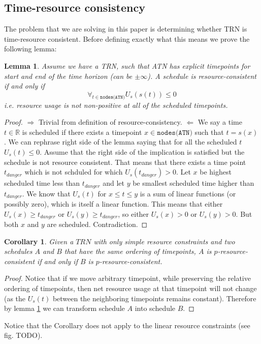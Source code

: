 \documentclass{article}
\newtheorem{corollary}{Corollary}[theorem]
\newtheorem{lemma}[theorem]{Lemma}
\begin{document}
\begin{multicols}{2}
\subsection{Time-resource consistency}
The problem that we are solving in this paper is determining whether TRN is time-resource consistent. Before defining exactly what this means we prove the following lemma:

\begin{lemma}
\label{resource_checking}
Assume we have a TRN, such that ATN has explicit timepoints for start and end of the time horizon (can be $\pm \infty$).
A schedule is resource-consistent if and only if
\[
\forall_{t \in \texttt{nodes(ATN)}} U_s(s(t)) \leq 0
\]
i.e. resource usage is not non-positive at all of the scheduled timepoints.
\end{lemma}
\begin{proof}
$\Rightarrow$ Trivial from definition of resource-consistency.
$\Leftarrow$ We say a time $t \in \mathbb{R}$ is scheduled if there exists a timepoint  $x \in \texttt{nodes(ATN)}$ such that $t = s(x)$. We can rephrase right side of the lemma saying that for all the scheduled $t$ $U_s(t) \leq 0$. Assume that the right side of the implication is satisfied but the schedule is not resource consistent. That means that there exists a time point $t_{danger}$ which is not schduled for which $U_s(t_{danger}) > 0 $. Let $x$ be highest scheduled time less than $t_{danger}$ and let $y$ be smallest scheduled time higher than $t_{danger}$. We know that $U_s(t)$ for $x \leq t \leq y$ is a sum of linear functions (or possibly zero), which is itself a linear function. This means that either $U_s(x) \geq t_{danger}$ or $U_s(y) \geq t_{danger}$, so either $U_s(x) > 0$ or $U_s(y) > 0$. But both $x$ and $y$ are scheduled. Contradiction.

\end{proof}
\begin{corollary}
Given a $TRN$ with only simple resource constraints and two schedules $A$ and $B$ that have the same ordering of timepoints, $A$ is $p$-resource-consistent if and only if $B$ is $p$-resource-consistent.
\end{corollary}
\begin{proof}
Notice that if we move arbitrary timepoint, while preserving the relative ordering of timepoints, then net resource usage at that timepoint will not change (as the $U_s(t)$ between the neighboring timepoints remains constant). Therefore by lemma \ref{resource_checking} we can transform schedule $A$ into schedule $B$.
\end{proof}
Notice that the Corollary does not apply to the linear resource constraints (see fig. TODO).


\end{multicols}
\end{document}
